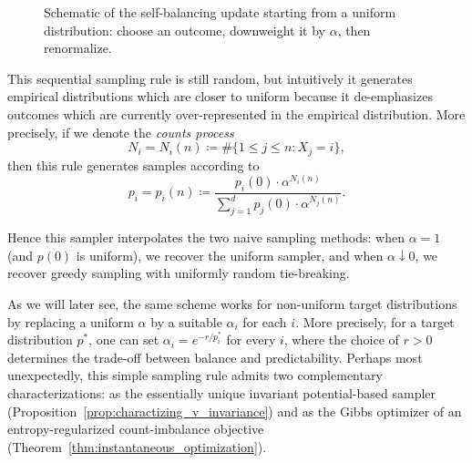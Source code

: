 \begin{figure}
\caption{Schematic of the self-balancing update starting from a uniform distribution: choose an outcome, downweight it by \(\alpha\), then renormalize.}
\label{fig:uniform_downweight_normalize}
\end{figure}


This sequential sampling rule is still random, but intuitively it generates empirical 
distributions which are closer to uniform because it de-emphasizes outcomes which are 
currently over-represented in the empirical distribution. More precisely, if we denote 
the \emph{counts process}
%
    \[N_i = N_i(n) \coloneqq \# \{ 1 \leq j \leq n : X_j = i\},\]
%
then this rule generates samples according to
$$p_i = p_{i}(n) \coloneqq \frac{p_{i}(0) \cdot \alpha^{N_i(n)}}{\sum_{j=1}^d p_{j}(0) \cdot \alpha^{N_j(n)} }.$$

\noindent Hence this sampler interpolates the two naive sampling methods: 
when $\alpha = 1$ (and $p(0)$ is uniform), we recover the uniform sampler, and 
when $\alpha \downarrow 0$, we recover greedy sampling with uniformly
 random tie-breaking.

As we will later see, the same scheme works for non-uniform target distributions 
by replacing a uniform $\alpha$ by a suitable $\alpha_i$ for each $i$. More 
precisely, for a target distribution $p^*$, one can set $\alpha_i = e^{-r/p_i^*}$ 
for every $i$, where the choice of $r > 0$ determines the trade-off between balance
 and predictability. Perhaps most unexpectedly, this simple sampling rule admits 
 two complementary characterizations: as the essentially unique invariant 
 potential-based sampler (Proposition~\ref{prop:charactizing_v_invariance}) and 
 as the Gibbs optimizer of an entropy-regularized count-imbalance objective 
 (Theorem~\ref{thm:instantaneous_optimization}).

